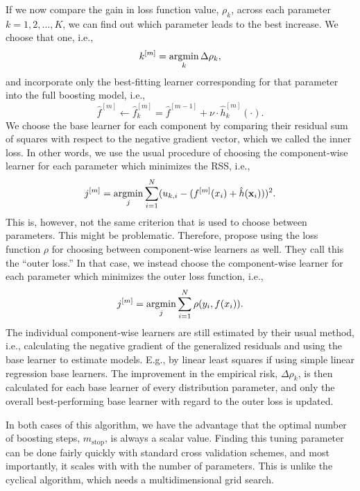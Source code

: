If we now compare the gain in loss function value, $\rho_{k}$, across each parameter $k=1,2,\ldots,K$, we can find out which parameter leads to the best increase. We choose that one, i.e.,
\begin{equation}
    k^{[m]}=\operatorname*{argmin}_k\Delta\rho_{k},
\end{equation}
and incorporate only the best-fitting learner corresponding for that parameter into the full boosting model, i.e.,
\begin{equation}
    \hat{f}^{[m]}\gets \hat{f}^{[m]}_{k}=\hat{f}^{[m-1]}+\nu\cdot\hat{h}^{[m]}_{k}(\cdot).
\end{equation}
We choose the base learner for each component by comparing their residual sum of squares with respect to the negative gradient vector, which we called the inner loss. In other words, we use the usual procedure of choosing the component-wise learner for each parameter which minimizes the RSS, i.e.,
\begin{equation}
    j^{[m]}=\operatorname*{argmin}_{j} \sum_{i=1}^N (u_{k,i}-(f^{[m]}(x_i)+\hat{h}(\mathbf{x}_i)))^2.
\end{equation}
This is, however, not the same criterion that is used to choose between parameters. This might be problematic. Therefore, \citet{thomas2018} propose using the loss function $\rho$ for choosing between component-wise learners as well. They call this the ``outer loss.'' In that case, we instead choose the component-wise learner for each parameter which minimizes the outer loss function, i.e., 
\begin{equation}
    j^{[m]}=\operatorname*{argmin}_{j} \sum_{i=1}^N \rho(y_i,f(x_i)).
\end{equation}
The individual component-wise learners are still estimated by their usual method, i.e., calculating the negative gradient of the generalized residuals and using the base learner to estimate models. E.g., by linear least squares if using simple linear regression base learners. The improvement in the empirical risk, $\Delta\rho_{k}$, is then calculated for each base learner of every distribution parameter, and only the overall best-performing base learner with regard to the outer loss is updated.

In both cases of this algorithm, we have the advantage that the optimal number of boosting steps, $m_{\text{stop}}$, is always a scalar value. Finding this tuning parameter can be done fairly quickly with standard cross validation schemes, and most importantly, it scales with with the number of parameters. This is unlike the cyclical algorithm, which needs a multidimensional grid search.

